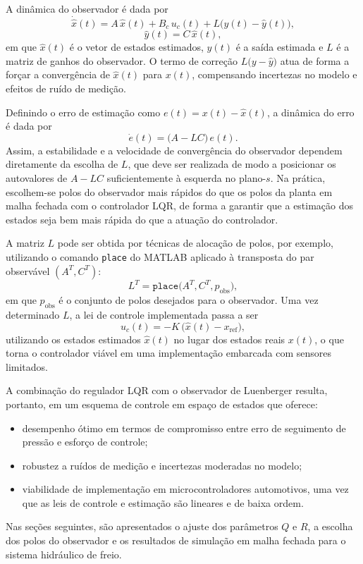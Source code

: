 A dinâmica do observador é dada por
\[
    \dot{\hat{x}}(t) = A\,\hat{x}(t) + B_c\,u_c(t)
                       + L\big(y(t) - \hat{y}(t)\big),
\]
\[
    \hat{y}(t) = C\,\hat{x}(t),
\]
em que $\hat{x}(t)$ é o vetor de estados estimados, $\hat{y}(t)$ é a saída estimada e $L$ é a matriz de ganhos do observador. O termo de correção $L\big(y - \hat{y}\big)$ atua de forma a forçar a convergência de $\hat{x}(t)$ para $x(t)$, compensando incertezas no modelo e efeitos de ruído de medição.

Definindo o erro de estimação como $e(t) = x(t) - \hat{x}(t)$, a dinâmica do erro é dada por
\[
    \dot{e}(t) = \big(A - L C\big)\,e(t).
\]
Assim, a estabilidade e a velocidade de convergência do observador dependem diretamente da escolha de $L$, que deve ser realizada de modo a posicionar os autovalores de $A - LC$ suficientemente à esquerda no plano-$s$. Na prática, escolhem-se polos do observador mais rápidos do que os polos da planta em malha fechada com o controlador LQR, de forma a garantir que a estimação dos estados seja bem mais rápida do que a atuação do controlador.

A matriz $L$ pode ser obtida por técnicas de alocação de polos, por exemplo, utilizando o comando \texttt{place} do MATLAB aplicado à transposta do par observável $(A^{T}, C^{T})$:
\[
    L^{T} = \texttt{place}\big(A^{T}, C^{T}, p_{\text{obs}}\big),
\]
em que $p_{\text{obs}}$ é o conjunto de polos desejados para o observador. Uma vez determinado $L$, a lei de controle implementada passa a ser
\[
    u_c(t) = -K\,\big(\hat{x}(t) - x_{\text{ref}}\big),
\]
utilizando os estados estimados $\hat{x}(t)$ no lugar dos estados reais $x(t)$, o que torna o controlador viável em uma implementação embarcada com sensores limitados.

A combinação do regulador LQR com o observador de Luenberger resulta, portanto, em um esquema de controle em espaço de estados que oferece:
\begin{itemize}
    \item desempenho ótimo em termos de compromisso entre erro de seguimento de pressão e esforço de controle;
    \item robustez a ruídos de medição e incertezas moderadas no modelo;
    \item viabilidade de implementação em microcontroladores automotivos, uma vez que as leis de controle e estimação são lineares e de baixa ordem.
\end{itemize}
Nas seções seguintes, são apresentados o ajuste dos parâmetros $Q$ e $R$, a escolha dos polos do observador e os resultados de simulação em malha fechada para o sistema hidráulico de freio.



